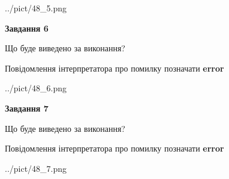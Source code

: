 \documentclass[10pt, ukrainian]{article}
\begin{document}
{\begin {large}
\begin{center}
	{../pict/48_5.png}
\end{center}
\newpage

{\begin {center}\textbf{Завдання 6}\end {center}}\par
Що буде виведено за виконання? \par
Повідомлення інтерпретатора про помилку позначати \textbf{error}

\begin{center}
	{../pict/48_6.png}
\end{center}
\newpage

{\begin {center}\textbf{Завдання 7}\end {center}}\par
Що буде виведено за виконання? \par
Повідомлення інтерпретатора про помилку позначати \textbf{error}

\begin{center}
	{../pict/48_7.png}
\end{center}
\newpage

\end {large}}
\end{document}

